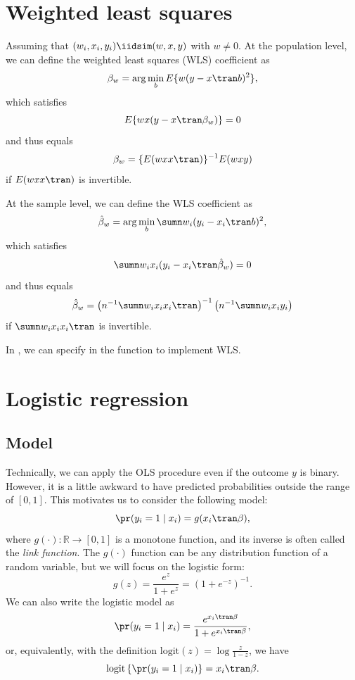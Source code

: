 \section{Weighted least squares}
\label{sec::appendix-wls}


Assuming that $(w_i, x_i, y_i) \iidsim (w, x, y)$ with $w\neq 0$. At the population level, we can define the weighted least squares (WLS) coefficient as
$$
\beta_w = \arg\min_b  E\{  w (y-x \tran b)^{2}    \},
$$
which satisfies
$$
E  \{  w x (y-x \tran \beta_w ) \} = 0
$$
and thus equals
$$
\beta_w  = \{  E  ( w xx\tran ) \}^{-1} E(  w xy )
$$
if $E  ( w xx\tran )$ is invertible. 

At the sample level, we can define the WLS coefficient as
$$
\hat{\beta}_w = \arg\min_b \sumn w_i (y_i-x_i \tran b)^{2},
$$
which satisfies
$$
\sumn w_i x_i (y_i -x_i \tran \hat\beta_w ) = 0
$$
and thus equals
$$
\hat \beta_w  =  \left(  n^{-1} \sumn   w_i x_ix_i\tran \right)^{-1} \left(   n^{-1} \sumn   w_i x_i y_i \right)
$$
if $\sumn   w_i x_ix_i\tran$ is invertible. 

In , we can specify  in the  function to implement WLS. 



\section{Logistic regression}\label{sec::logistic-regression}




 
  
 \subsection{Model}
Technically, we can apply the OLS procedure even if the outcome $y$ is binary. However, it is a little awkward to have predicted probabilities outside the range of $[0,1]$. This motivates us to consider the
following model:
\[
\pr(y_{i}=1\mid x_{i})=g(x_{i} \tran \beta),
\]
where $g(\cdot):\mathbb{R}\rightarrow[0,1]$ is a monotone function,
and its inverse is often called the {\it  link function}. The $g(\cdot)$ function can be any distribution function of a random variable, but we will focus on the logistic form:
$$
g(z) =  \frac{ e^z }{1 + e^z} = (1 + e^{-z})^{-1}. 
$$
We can also write the logistic model
as
$$
\pr(y_{i}=1\mid x_{i}) =\frac{e^{x_{i} \tran \beta}}{1+e^{x_{i} \tran \beta}},
$$
or, equivalently, with the definition $\text{logit}(z) = \log\frac{z}{1-z}$, we have 
\[
\text{logit}\left\{ \pr(y_{i}=1\mid x_{i})\right\}  =x_{i} \tran \beta.
\]


